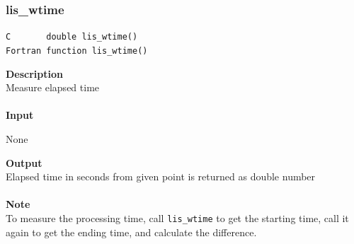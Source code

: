 \documentclass[a4paper]{article}
\newcommand{\namelistlabel}[1]{\mbox{#1}\hfill}
\newenvironment{namelist}[1]{%
 \begin{list}{}
  {\let\makelabel\namelistlabel
  \settowidth{\labelwidth}{#1}
  \setlength{\leftmargin}{1.1\labelwidth}}
}{%
\end{list}}
\begin{document}
  \subsubsection{lis\_wtime}
\begin{screen}
\verb|C       double lis_wtime()|\\
\verb|Fortran function lis_wtime()|
\end{screen}
{\bf Description}\\
\indent
Measure elapsed time
\\ \\
\noindent
{\bf Input}
\begin{namelist}{XXXXXXXXXXXXXXXXXXXX}
\item[None]
\end{namelist}
{\bf Output}\\
\indent
Elapsed time in seconds from given point is returned as double number
\\ \\
\noindent
{\bf Note}\\
\indent
To measure the processing time, call \verb|lis_wtime| to get
the starting time, call it again to get the ending time, 
and calculate the difference. 
\end{document}

